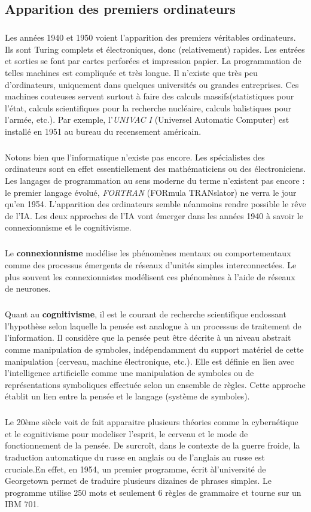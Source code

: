 \subsection{Apparition des premiers ordinateurs}
\subparagraph{}
Les années 1940 et 1950 voient l'apparition des premiers véritables ordinateurs.
Ils sont Turing complets et électroniques, donc (relativement) rapides. Les entrées et sorties se font par cartes perforées et impression papier. La programmation de telles machines est compliquée et très longue. Il n'existe que très peu d'ordinateurs, uniquement dans quelques universités ou grandes entreprises. Ces machines couteuses servent surtout à faire des calculs massifs(statistiques pour l'état, calculs
scientifiques pour la recherche nucléaire, calculs balistiques pour l'armée, etc.). Par exemple, l'\textit{UNIVAC I} (Universel Automatic Computer) est installé en 1951 au bureau du recensement américain.
\subparagraph{}
Notons bien que l'informatique n'existe pas encore. Les spécialistes des ordinateurs sont en effet essentiellement des mathématiciens ou des électroniciens. Les langages de programmation au sens moderne du terme n'existent pas encore : le premier langage évolué, \textit{FORTRAN} (FORmula TRANslator) ne verra le jour qu'en 1954. 
L'apparition des ordinateurs semble néanmoins rendre possible le rêve de l'IA. Les deux approches de l'IA vont émerger dans les années 1940 à savoir le connexionnisme et le cognitivisme.
\subparagraph{}
Le \textbf{connexionnisme} modélise les phénomènes mentaux ou comportementaux comme des processus émergents de réseaux d'unités simples interconnectées. Le plus souvent les connexionnistes modélisent ces phénomènes à l'aide de réseaux de neurones.
\subparagraph{}
Quant au \textbf{cognitivisme}, il est le courant de recherche scientifique endossant l'hypothèse selon laquelle la pensée est analogue à un processus de traitement de l'information. Il considère que la pensée peut être décrite à un niveau abstrait comme manipulation de symboles, indépendamment du support matériel de cette manipulation (cerveau, machine électronique, etc.).
Elle est définie en lien avec l'intelligence artificielle comme une manipulation de symboles ou de représentations symboliques effectuée selon un ensemble de règles. Cette approche établit un lien entre la pensée et le langage (système de symboles).

\subparagraph{}
Le 20ème siècle voit de fait apparaitre plusieurs théories comme la cybernétique et le cognitivisme pour modeliser l'esprit, le cerveau et le mode de fonctionnement de la pensée. De surcroît, dans le contexte de la guerre froide, la traduction automatique du russe en anglais ou de l'anglais au russe est cruciale.En effet, en 1954, un premier programme, écrit àl'université de Georgetown permet de traduire plusieurs dizaines de phrases simples. Le programme utilise 250 mots et seulement 6 règles de grammaire et tourne sur un IBM 701.

